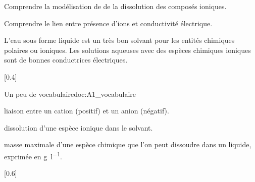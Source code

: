 \teteTermStssEnvi

\vspace*{-36pt}


\begin{objectifs}
  \item Comprendre la modélisation de de la dissolution des composés ioniques.
  \item Comprendre le lien entre présence d'ions et conductivité électrique.
\end{objectifs}

\begin{contexte}
  L'eau sous forme liquide est un très bon solvant pour les entités chimiques polaires ou ioniques.
  Les solutions aqueuses avec des espèces chimiques ioniques sont de bonnes conductrices électriques.
  
\end{contexte}


[0.4]{
  \begin{doc}{Un peu de vocabulaire}{doc:A1_vocabulaire}
    \begin{encart}
      \pointCyan {}
      liaison entre un cation (positif) et un anion (négatif).
      
      \pointCyan {}
      dissolution d'une espèce ionique dans le solvant.
      
      \pointCyan {}
      masse maximale d'une espèce chimique que l'on peut dissoudre dans un liquide, exprimée en \unit{\g\per\litre}.
    \end{encart}
  \end{doc}
}[0.6]

